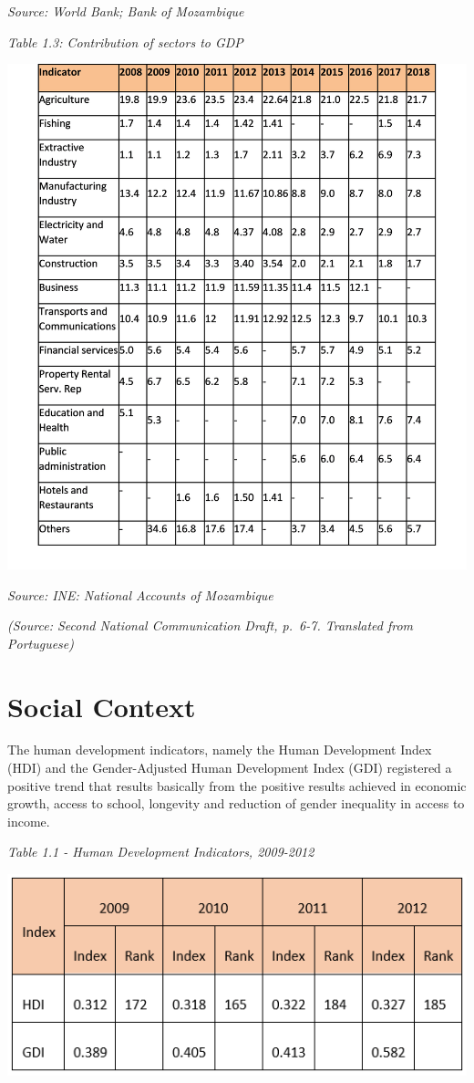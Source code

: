 \documentclass[
]{book}
\begin{document}
\emph{Source: World Bank; Bank of Mozambique}

\emph{Table 1.3: Contribution of sectors to GDP}

\includegraphics{Figure8.png}

\emph{Source: INE: National Accounts of Mozambique}

\emph{(Source: Second National Communication Draft, p.~6-7. Translated from Portuguese)}

\hypertarget{social-context}{%
\section{Social Context}\label{social-context}}

The human development indicators, namely the Human Development Index (HDI) and the Gender-Adjusted Human Development Index (GDI) registered a positive trend that results basically from the positive results achieved in economic growth, access to school, longevity and reduction of gender inequality in access to income.

\emph{Table 1.1 - Human Development Indicators, 2009-2012}

\includegraphics{Figure9.png}
\end{document}
